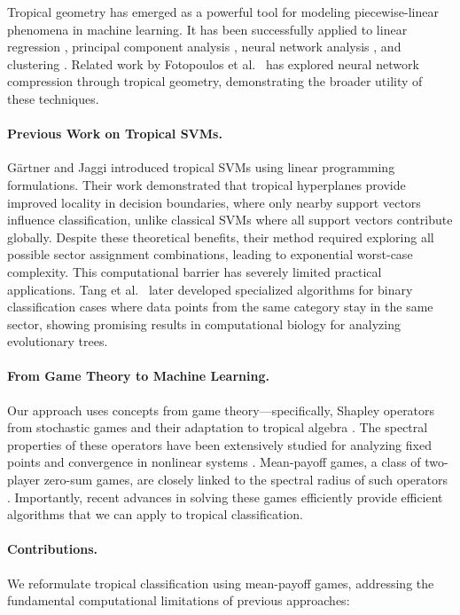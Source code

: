 \documentclass{article}
\begin{document}
Tropical geometry has emerged as a powerful tool for modeling piecewise-linear phenomena in machine learning. It has been successfully applied to linear regression \cite{akian2020}, principal component analysis \cite{yoshida2019}, neural network analysis \cite{maragos2021}, and clustering \cite{monod2022}. Related work by Fotopoulos et al.~\cite{fotopoulos2024} has explored neural network compression through tropical geometry, demonstrating the broader utility of these techniques.

\paragraph{Previous Work on Tropical SVMs.} Gärtner and Jaggi \cite{gartner2008} introduced tropical SVMs using linear programming formulations. Their work demonstrated that tropical hyperplanes provide improved locality in decision boundaries, where only nearby support vectors influence classification, unlike classical SVMs where all support vectors contribute globally. Despite these theoretical benefits, their method required exploring all possible sector assignment combinations, leading to exponential worst-case complexity. This computational barrier has severely limited practical applications. Tang et al.~\cite{tang2020} later developed specialized algorithms for binary classification cases where data points from the same category stay in the same sector, showing promising results in computational biology for analyzing evolutionary trees.

\paragraph{From Game Theory to Machine Learning.} Our approach uses concepts from game theory—specifically, Shapley operators from stochastic games \cite{shapley1953} and their adaptation to tropical algebra \cite{kolokoltsov1997}. The spectral properties of these operators have been extensively studied for analyzing fixed points and convergence in nonlinear systems \cite{gaubert2004}. Mean-payoff games, a class of two-player zero-sum games, are closely linked to the spectral radius of such operators \cite{zwick1996}. Importantly, recent advances in solving these games efficiently \cite{allamigeon2025} provide efficient algorithms that we can apply to tropical classification.

\paragraph{Contributions.} We reformulate tropical classification using mean-payoff games, addressing the fundamental computational limitations of previous approaches:
\end{document}
